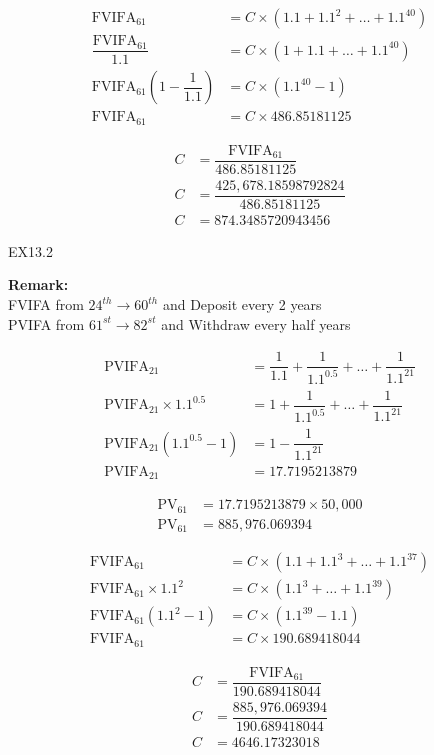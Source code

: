 \documentclass{article}
\begin{document}
	\vspace{0.1in}
	\begin{align*}
	\mbox{FVIFA}_{61} &= C \times (1.1 + 1.1^2 + \dots + 1.1^{40}) \\
	\dfrac{\mbox{FVIFA}_{61}}{1.1} &= C \times (1 + 1.1 + \dots + 1.1^{40}) \\
	\mbox{FVIFA}_{61} (1 - \dfrac{1}{1.1}) &= C \times (1.1^{40} - 1) \\
	\mbox{FVIFA}_{61} &= C \times 486.85181125
	\end{align*}	
	
	\vspace{0.1in}
	\begin{align*}	
	C &= \dfrac{\mbox{FVIFA}_{61}}{486.85181125} \\ 
	C &= \dfrac{425,678.18598792824}{486.85181125} \\ 
	C &= 874.3485720943456
	\end{align*}
	
	\newpage
	EX13.2
	
	
	\textbf{Remark:} \\
	
	FVIFA from $24^{th} \rightarrow 60^{th} $ and Deposit every 2 years\\
	\indent PVIFA from $61^{st} \rightarrow 82^{st} $ and Withdraw every half years
	
	\begin{align*}
	\mbox{PVIFA}_{21} &= \dfrac{1}{1.1} + \dfrac{1}{1.1^{0.5}} + \dots + \dfrac{1}{1.1^{21}} \\
	\mbox{PVIFA}_{21} \times 1.1^{0.5} &= 1 + \dfrac{1}{1.1^{0.5}} + \dots + \dfrac{1}{1.1^{21}} \\ 
	\mbox{PVIFA}_{21} (1.1^{0.5} - 1) &= 1 - \dfrac{1}{1.1^{21}} \\
	\mbox{PVIFA}_{21} &= 17.7195213879
	\end{align*}
	
	\vspace{0.1in}
	\begin{align*}	
	\mbox{PV}_{61} &= 17.7195213879 \times 50,000 \\
	\mbox{PV}_{61} &= 885,976.069394
	\end{align*}
	
	\vspace{0.1in}
	\begin{align*}
	\mbox{FVIFA}_{61} &= C \times (1.1 + 1.1^3 + \dots + 1.1^{37}) \\
	\mbox{FVIFA}_{61} \times 1.1^2 &= C \times (1.1^3 + \dots + 1.1^{39}) \\
	\mbox{FVIFA}_{61} (1.1^2 - 1) &= C \times (1.1^{39} - 1.1) \\
	\mbox{FVIFA}_{61} &= C \times 190.689418044
	\end{align*}	
		
		\vspace{0.1in}
		\begin{align*}	
		C &= \dfrac{\mbox{FVIFA}_{61}}{190.689418044} \\ 
		C &= \dfrac{885,976.069394}{190.689418044} \\ 
		C &= 4646.17323018
		\end{align*}
\end{document}
